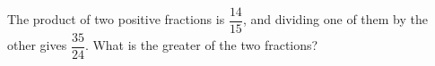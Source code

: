 The product of two positive fractions is $\dfrac{14}{15}$, and dividing one of them by the other gives $\dfrac{35}{24}$. What is the greater of the two fractions?
